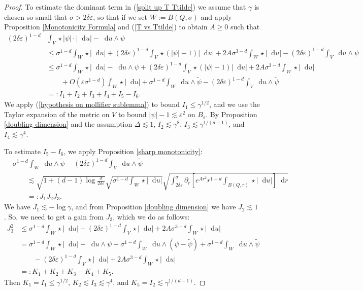 \documentclass[reqno,10pt]{amsart}
\newcommand*\dif{\mathop{}\!\mathrm{d}}
\theoremstyle{definition}
\numberwithin{equation}{section}
\begin{document}
\begin{proof}
To estimate the dominant term in (\ref{split up T Ttilde}) we assume that $\gamma$ is chosen so small that $\sigma > 2\delta\varepsilon$, so that if we set $W := B(Q, \sigma)$ and apply Proposition \ref{Monotonicity Formula} and (\ref{T vs Ttilde}) to obtain $A \geq 0$ such that
\begin{align*}
(2\delta\varepsilon)^{1 - d} &\int_V \star |\psi| \cdot |\dif u| - \dif u \wedge \psi \\
&\leq \sigma^{1 - d}\int_W \star |\dif u| + (2\delta\varepsilon)^{1 - d} \int_V \star(|\psi| - 1)|\dif u| + 2A\sigma^{3 - d} \int_W \star |\dif u| - (2\delta\varepsilon)^{1 - d}\int_V \dif u \wedge \psi\\
&\leq \sigma^{1 - d}\int_W \star |\dif u| - \dif u \wedge \psi + (2\delta\varepsilon)^{1 - d} \int_V \star(|\psi| - 1)|\dif u| + 2A\sigma^{3 - d} \int_W \star |\dif u| \\
&\qquad + O(\varepsilon \sigma^{1 - d}) \int_W \star |\dif u| + \sigma^{1 - d}\int_W \dif u \wedge \tilde \psi - (2\delta\varepsilon)^{1 - d}\int_V \dif u \wedge \tilde \psi\\
&=: I_1 + I_2 + I_3 + I_4 + I_5 - I_6.
\end{align*}
We apply (\ref{hypothesis on mollifier sublemma}) to bound $I_1 \leq \gamma^{1/2}$, and we use the Taylor expansion of the metric on $V$ to bound $|\psi| - 1 \lesssim \varepsilon^2$ on $B_\varepsilon$.
By Proposition \ref{doubling dimension} and the assumption $\Delta \lesssim 1$, $I_2 \lesssim \gamma^8$, $I_3 \lesssim \gamma^{1/(d - 1)}$, and $I_4 \lesssim \gamma^4$.

To estimate $I_5 - I_6$, we apply Proposition \ref{sharp monotonicity}:
\begin{align*}
&\sigma^{1 - d} \int_W \dif u \wedge \tilde \psi - (2\delta\varepsilon)^{1 - d} \int_V \dif u \wedge \tilde \psi \\
&\qquad \lesssim \sqrt{1 + (d - 1) \log \frac{\sigma}{2\delta\varepsilon}} \sqrt{\sigma^{1 - d} \int_W \star |\dif u|} \sqrt{\int_{2\delta\varepsilon}^\sigma \partial_r \left[e^{Ar^2} r^{1 - d} \int_{B(Q, r)} \star |\dif u|\right] \dif r}\\
&\qquad =: J_1 J_2 J_3.
\end{align*}
We have $J_1 \lesssim -\log \gamma$, and from Proposition \ref{doubling dimension} we have $J_2 \lesssim 1$.
So, we need to get a gain from $J_3$, which we do as follows:
\begin{align*}
J_3^2 &\leq \sigma^{1 - d} \int_W \star |\dif u| - (2 \delta \varepsilon)^{1 - d} \int_V \star |\dif u| + 2A\sigma^{3 - d} \int_W \star |\dif u| \\
&= \sigma^{1 - d} \int_W \star |\dif u| - \dif u \wedge \psi + \sigma^{1 - d} \int_W \dif u \wedge (\psi - \tilde \psi) + \sigma^{1 - d} \int_W \dif u \wedge \tilde \psi \\
&\qquad - (2 \delta\varepsilon)^{1 - d} \int_V \star |\dif u| + 2A \sigma^{3 - d} \int_W \star |\dif u| \\
&=: K_1 + K_2 + K_3 - K_4 + K_5.
\end{align*}
Then $K_1 = I_1 \leq \gamma^{1/2}$, $K_2 \lesssim I_3 \lesssim \gamma^4$, and $K_5 = I_2 \lesssim \gamma^{1/(d - 1)}$.


\end{proof}
\end{document}
